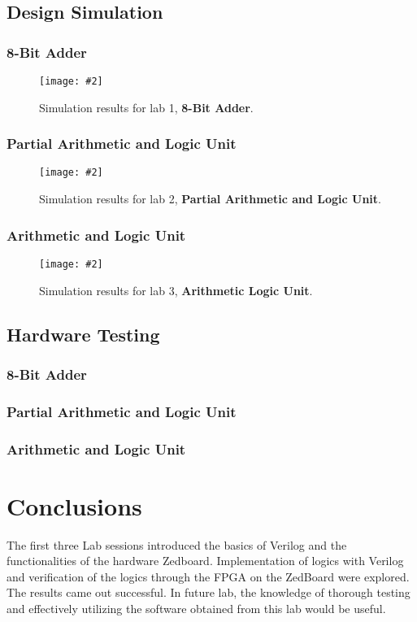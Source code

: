 \documentclass[12pt, letterpaper]{article}
\newcommand{\InsertImage}[3][\linewidth]{
	\begin{figure}[h]
		\centering
		\texttt{[image: \#2]}
		\caption{#3}
	\end{figure}
}
\newcommand{\InsertImageHere}[3][\linewidth]{
	\FloatBarrier
	\InsertImage[#1]{#2}{#3}
	\FloatBarrier
}
\begin{document}
\subsection{Design Simulation}


\subsubsection{8-Bit Adder}

\InsertImageHere{images/simulations/lab1/simulation.png}{Simulation results for lab 1, \textbf{8-Bit Adder}.}

\subsubsection{Partial Arithmetic and Logic Unit}

\InsertImageHere{images/simulations/lab2/simulation.png}{Simulation results for lab 2, \textbf{Partial Arithmetic and Logic Unit}.}

\subsubsection{Arithmetic and Logic Unit}

\InsertImageHere{images/simulations/lab3/simulation.png}{Simulation results for lab 3, \textbf{Arithmetic Logic Unit}.}


\subsection{Hardware Testing}


\subsubsection{8-Bit Adder}

\subsubsection{Partial Arithmetic and Logic Unit}

\subsubsection{Arithmetic and Logic Unit}




\newpage
\section{Conclusions}
The first three Lab sessions introduced the basics of Verilog and the functionalities of the hardware Zedboard. Implementation of logics with Verilog and verification of the logics through the FPGA on the ZedBoard were explored. The results came out successful. In future lab, the knowledge of thorough testing and effectively utilizing the software obtained from this lab would be useful.  
\end{document}
